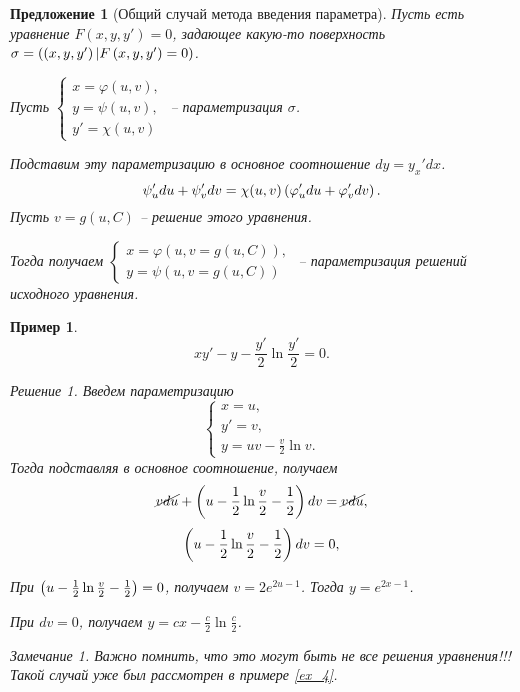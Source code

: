 \documentclass[a5paper, 10pt]{article}
\theoremstyle{definition}
\theoremstyle{plain}
\newtheorem*{Prop}{Предложение}
\newtheorem{Ex}{Пример}
\theoremstyle{remark}
\newtheorem*{Note}{Замечание}
\newtheorem*{Solution}{Решение}
\begin{document}
	\begin{Prop}[Общий случай метода введения параметра]
		Пусть есть уравнение $F(x,y,y') = 0$, задающее какую-то поверхность $\sigma=\left(\left(x,y,y'\right)|F\left(x,y,y'\right) = 0\right)$.
		
		Пусть $\begin{cases}
			x = \varphi(u,v),\\
			y=\psi(u,v),\\
			y' = \chi(u,v)
		\end{cases}$ -- параметризация $\sigma$.
	
		Подставим эту параметризацию в основное соотношение $dy = y_x' dx$.
		\[
		\psi_u' du + \psi_v' dv = \chi(u,v) \left(\varphi_u'du + \varphi_v' dv\right).
		\]
		Пусть $v=g(u, C)$ -- решение этого уравнения.
		
		Тогда получаем $\begin{cases}
			x = \varphi(u,v=g(u, C)),\\
			y=\psi(u,v=g(u, C))
		\end{cases}$ -- параметризация решений исходного уравнения.
	\end{Prop}
	\begin{Ex}
		\[xy'-y-\frac{y'}{2}\ln\frac{y'}{2}=0.\]
		\begin{Solution}
			Введем параметризацию 
			\[
			\begin{cases}
				x = u, \\
				y' = v, \\
				y = uv-\frac{v}{2}\ln{v}.
			\end{cases}
			\]
			Тогда подставляя в основное соотношение, получаем
			\[
			\cancel{vdu} + \left(u-\frac12\ln\frac{v}{2} - \frac12\right)dv = \cancel{vdu},
			\]
			\[
			\left(u-\frac12\ln\frac{v}{2} - \frac12\right)dv = 0,
			\]
			
			При $\left(u-\frac12\ln\frac{v}{2} - \frac12\right) = 0$, получаем $v=2e^{2u-1}$. Тогда $y=e^{2x-1}$.
			
			При $dv=0$, получаем $y=cx-\frac{c}{2} \ln\frac{c}{2}$. 
			
			\begin{Note}
				Важно помнить, что это могут быть не все решения уравнения!!! Такой случай уже был рассмотрен в примере \ref{ex_4}.
			\end{Note}
		\end{Solution}
	\end{Ex}
\end{document}
